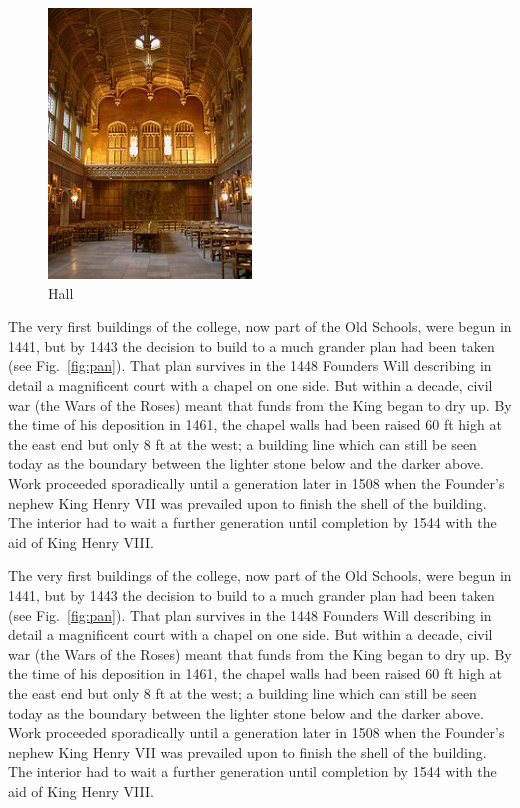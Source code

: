 \begin{figure}
  \begin{center}
    \includegraphics[width=0.48\textwidth]{Chapter2/Figures/dining.jpg}
  \end{center}
 \vspace{-2mm}
  \caption{Hall}
  \vspace{-4mm}
\end{figure}
The very first buildings of the college, now part of the Old Schools, were begun in 1441, but by 1443 the decision to build to a much grander plan had been taken (see Fig.~\ref{fig:pan}). That plan survives in the 1448 Founders Will describing in detail a magnificent court with a chapel on one side. But within a decade, civil war (the Wars of the Roses) meant that funds from the King began to dry up. By the time of his deposition in 1461, the chapel walls had been raised 60 ft high at the east end but only 8 ft at the west; a building line which can still be seen today as the boundary between the lighter stone below and the darker above. Work proceeded sporadically until a generation later in 1508 when the Founder's nephew King Henry VII was prevailed upon to finish the shell of the building. The interior had to wait a further generation until completion by 1544 with the aid of King Henry VIII.


The very first buildings of the college, now part of the Old Schools, were begun in 1441, but by 1443 the decision to build to a much grander plan had been taken (see Fig.~\ref{fig:pan}). That plan survives in the 1448 Founders Will describing in detail a magnificent court with a chapel on one side. But within a decade, civil war (the Wars of the Roses) meant that funds from the King began to dry up. By the time of his deposition in 1461, the chapel walls had been raised 60 ft high at the east end but only 8 ft at the west; a building line which can still be seen today as the boundary between the lighter stone below and the darker above. Work proceeded sporadically until a generation later in 1508 when the Founder's nephew King Henry VII was prevailed upon to finish the shell of the building. The interior had to wait a further generation until completion by 1544 with the aid of King Henry VIII.


